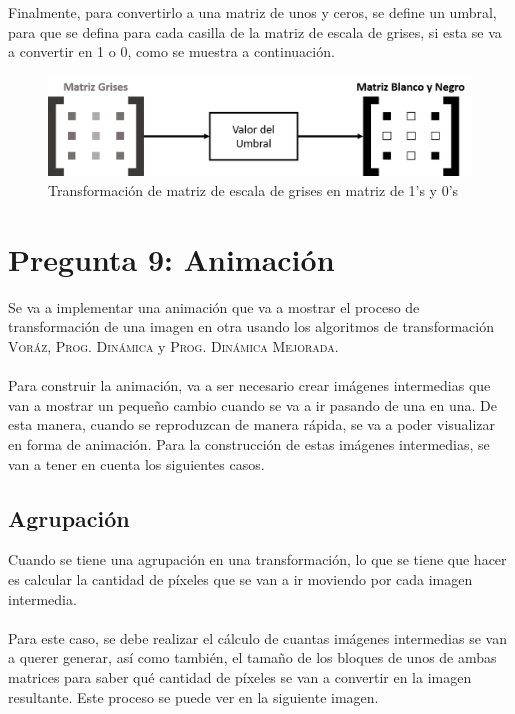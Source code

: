 \documentclass[conference]{IEEEtran}
\begin{document}
Finalmente, para convertirlo a una matriz de unos y ceros, se define un umbral, para que se defina para cada casilla de la matriz de escala de grises, si esta se va a convertir en 1 o 0, como se muestra a continuación.

\begin{figure}[H]
  \centering
  \includegraphics[scale=0.35]{images/matriz_negro.png}
  \caption[Negro]{Transformación de matriz de escala de grises en matriz de 1's y 0's}
  \label{fig:negro}
\end{figure}

\section{Pregunta 9: Animación}
Se va a implementar una animación que va a mostrar el proceso de transformación de una imagen en otra usando los algoritmos de transformación \textsc{Voráz}, \textsc{
Prog. Dinámica} y \textsc{Prog. Dinámica Mejorada}.
\verb||\\\\
Para construir la animación, va a ser necesario crear imágenes intermedias que van a mostrar un pequeño cambio cuando se va a ir pasando de una en una. De esta manera, cuando se reproduzcan de manera rápida, se va a poder visualizar en forma de animación. Para la construcción de estas imágenes intermedias, se van a tener en cuenta los siguientes casos.

\subsection{Agrupación}
Cuando se tiene una agrupación en una transformación, lo que se tiene que hacer es calcular la cantidad de píxeles que se van a ir moviendo por cada imagen intermedia.
\verb||\\\\
Para este caso, se debe realizar el cálculo de cuantas imágenes intermedias se van a querer generar, así como también, el tamaño de los bloques de unos de ambas matrices para saber qué cantidad de píxeles se van a convertir en la imagen resultante. Este proceso se puede ver en la siguiente imagen.
\end{document}
